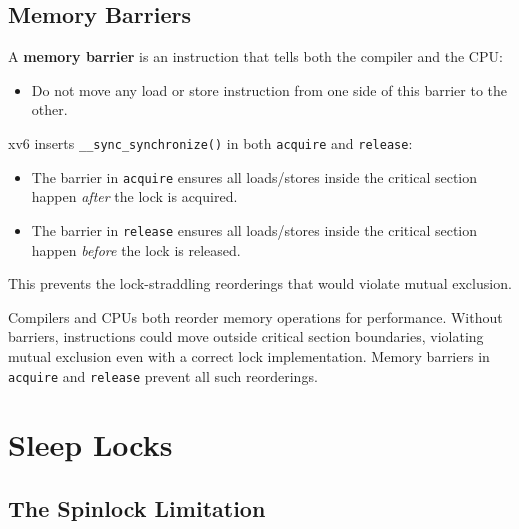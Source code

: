 \documentclass[11pt, a4paper]{article}
\begin{document}
\subsection{Memory Barriers}

\begin{tcolorbox}[memorder, title={Memory Barriers (\lstinline|__sync_synchronize()|)}]
A \textbf{memory barrier} is an instruction that tells both the compiler and the CPU:
\begin{itemize}[leftmargin=1.5em]
  \item Do not move any load or store instruction from one side of this barrier to the other.
\end{itemize}

xv6 inserts \lstinline|__sync_synchronize()| in both \lstinline|acquire| and \lstinline|release|:
\begin{itemize}[leftmargin=1.5em]
  \item The barrier in \lstinline|acquire| ensures all loads/stores inside the critical section happen \emph{after} the lock is acquired.
  \item The barrier in \lstinline|release| ensures all loads/stores inside the critical section happen \emph{before} the lock is released.
\end{itemize}

This prevents the lock-straddling reorderings that would violate mutual exclusion.
\end{tcolorbox}

\begin{tcolorbox}[summary, title={Section Summary}]
Compilers and CPUs both reorder memory operations for performance. Without barriers, instructions could move outside critical section boundaries, violating mutual exclusion even with a correct lock implementation. Memory barriers in \lstinline|acquire| and \lstinline|release| prevent all such reorderings.
\end{tcolorbox}

\section{Sleep Locks}

\subsection{The Spinlock Limitation}
\end{document}
